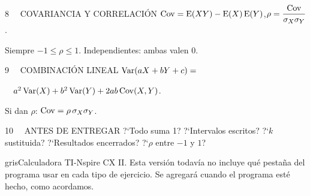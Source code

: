 \begin{tcbraster}[raster columns=2,raster equal height=rows,raster column skip=10pt,raster row skip=10pt]
\begin{tarjeta}{8 \ \ COVARIANCIA Y CORRELACI\'ON}
$\operatorname{Cov}=\operatorname{E}(XY)-\operatorname{E}(X)\operatorname{E}(Y)$,\quad $\rho=\dfrac{\operatorname{Cov}}{\sigma_X\sigma_Y}$.\par
Siempre $-1\le\rho\le1$. Independientes: ambas valen 0.
\end{tarjeta}
\begin{tarjeta}{9 \ \ COMBINACI\'ON LINEAL}
$\operatorname{Var}(aX+bY+c)=$\par $\quad a^2\operatorname{Var}(X)+b^2\operatorname{Var}(Y)+2ab\operatorname{Cov}(X,Y)$.\par
Si dan $\rho$: $\operatorname{Cov}=\rho\,\sigma_X\sigma_Y$.
\end{tarjeta}
\begin{tarjeta}{10 \ \ ANTES DE ENTREGAR}
?`Todo suma 1? ?`Intervalos escritos? ?`$k$ sustituida? ?`Resultados encerrados? ?`$\rho$ entre $-1$ y $1$?
\end{tarjeta}
\end{tcbraster}

\vfill
\begin{notacorta}{gris}{Calculadora TI-Nspire CX II.}
Esta versi\'on todav\'ia no incluye qu\'e pesta\~na del programa usar en cada tipo de ejercicio.
Se agregar\'a cuando el programa est\'e hecho, como acordamos.
\end{notacorta}
